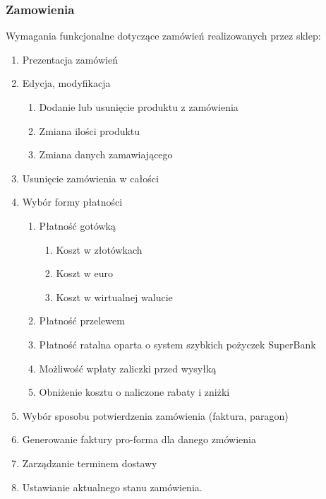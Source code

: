 \subsubsection{Zamowienia}

Wymagania funkcjonalne dotyczące zamówień realizowanych przez sklep:


\begin{enumerate}
  \item Prezentacja zamówień
  \item Edycja, modyfikacja
  \begin{enumerate}
    \item Dodanie lub usunięcie produktu z zamówienia
    \item Zmiana ilości produktu
    \item Zmiana danych zamawiającego
  \end{enumerate}
  \item Usunięcie zamówienia w całości
  \item Wybór formy płatności
  \begin{enumerate}
    \item Płatność gotówką
    \begin{enumerate}
      \item Koszt w złotówkach
      \item Koszt w euro
      \item Koszt w wirtualnej walucie
    \end{enumerate}
    \item Płatność przelewem
    \item Płatność ratalna oparta o system szybkich pożyczek SuperBank
    \item Możliwość wpłaty zaliczki przed wysyłką
    \item Obniżenie kosztu o naliczone rabaty i zniżki
  \end{enumerate}
  \item Wybór sposobu potwierdzenia zamówienia (faktura, paragon)
  \item Generowanie faktury pro-forma dla danego zmówienia
  \item Zarządzanie terminem dostawy
  \item Ustawianie aktualnego stanu zamówienia.
\end{enumerate}